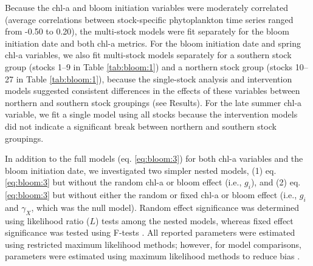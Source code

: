 Because the chl-a and bloom initiation variables were moderately correlated
(average correlations between stock-specific phytoplankton time series ranged
from -0.50 to 0.20), the multi-stock models were fit separately for the bloom
initiation date and both chl-a metrics. For the bloom initiation date and spring
chl-a variables, we also fit multi-stock models separately for a southern stock
group (stocks 1--9 in Table \ref{tab:bloom:1}) and a northern stock group (stocks
10--27 in Table \ref{tab:bloom:1}), because the single-stock analysis and
intervention models suggested consistent differences in the effects of these
variables between northern and southern stock groupings (see Results). For the
late summer chl-a variable, we fit a single model using all stocks because the
intervention models did not indicate a significant break between northern and
southern stock groupings.

In addition to the full models (eq. \ref{eq:bloom:3}) for both chl-a variables
and the bloom initiation date, we investigated two simpler nested models, (1)
eq. \ref{eq:bloom:3} but without the random chl-a or bloom effect (i.e.,
\(g_{i}\)), and (2) eq. \ref{eq:bloom:3} but without either the random or fixed
chl-a or bloom effect (i.e., \(g_{i}\) and \(\gamma_{X}\), which was the null
model).  Random effect significance was determined using likelihood ratio ($L$)
tests among the nested models, whereas fixed effect significance was tested
using F-tests \citep{Pinheiro2000a}. All reported parameters were estimated
using restricted maximum likelihood methods; however, for model comparisons,
parameters were estimated using maximum likelihood methods to reduce bias
\citep{Pinheiro2000a}.

